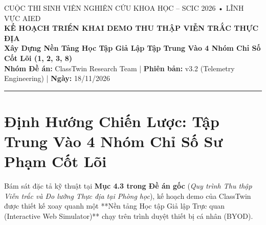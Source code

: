 \documentclass[11pt,a4paper]{article}
\begin{document}
\begin{center}
  {\scshape\footnotesize CUỘC THI SINH VIÊN NGHIÊN CỨU KHOA HỌC -- SCIC 2026 \quad • \quad LĨNH VỰC AIED}\\[2mm]
  {\Large\bfseries\color{NavyDark} KẾ HOẠCH TRIỂN KHAI DEMO THU THẬP VIỄN TRẮC THỰC ĐỊA}\\[1mm]
  {\normalsize\bfseries\color{TealPrimary} Xây Dựng Nền Tảng Học Tập Giả Lập Tập Trung Vào 4 Nhóm Chỉ Số Cốt Lõi (1, 2, 3, 8)}\\[2mm]
  {\footnotesize \textbf{Nhóm Đề án:} ClassTwin Research Team \quad | \quad \textbf{Phiên bản:} v3.2 (Telemetry Engineering) \quad | \quad \textbf{Ngày:} 18/11/2026}
\end{center}
\vspace{-2mm}
\noindent\textcolor{TealPrimary}{\rule{\textwidth}{1pt}}
\vspace{2mm}

\section{Định Hướng Chiến Lược: Tập Trung Vào 4 Nhóm Chỉ Số Sư Phạm Cốt Lõi}\label{sec:dinh-huong}

Bám sát đặc tả kỹ thuật tại \textbf{Mục 4.3 trong Đề án gốc} (\textit{Quy trình Thu thập Viễn trắc và Đo lường Thực địa tại Phòng học}), kế hoạch demo của ClassTwin được thiết kế xoay quanh một **Nền tảng Học tập Giả lập Trực quan (Interactive Web Simulator)** chạy trên trình duyệt thiết bị cá nhân (BYOD). 
\end{document}
